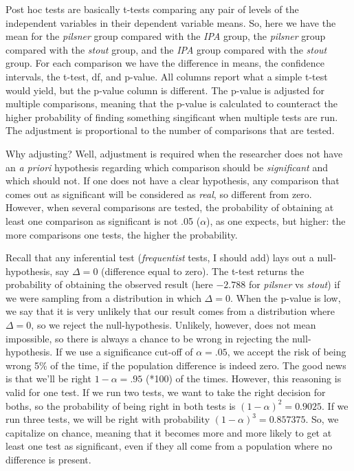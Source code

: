 \documentclass[
]{book}
\begin{document}
Post hoc tests are basically t-tests comparing any pair of levels of the independent variables in their dependent variable means. So, here we have the mean for the \emph{pilsner} group compared with the \emph{IPA} group, the \emph{pilsner} group compared with the \emph{stout} group, and the \emph{IPA} group compared with the \emph{stout} group. For each comparison we have the difference in means, the confidence intervals, the t-test, df, and p-value. All columns report what a simple t-test would yield, but the p-value column is different. The p-value is adjusted for multiple comparisons, meaning that the p-value is calculated to counteract the higher probability of finding something singificant when multiple tests are run. The adjustment is proportional to the number of comparisons that are tested.

Why adjusting? Well, adjustment is required when the researcher does not have an \emph{a priori} hypothesis regarding which comparison should be \emph{significant} and which should not. If one does not have a clear hypothesis, any comparison that comes out as significant will be considered as \emph{real}, so different from zero. However, when several comparisons are tested, the probability of obtaining at least one comparison as significant is not .05 (\(\alpha\)), as one expects, but higher: the more comparisons one tests, the higher the probability.

Recall that any inferential test (\emph{frequentist} tests, I should add) lays out a null-hypothesis, say \(\Delta=0\) (difference equal to zero). The t-test returns the probability of obtaining the observed result (here \(-2.788\) for \emph{pilsner} vs \emph{stout}) if we were sampling from a distribution in which \(\Delta=0\). When the p-value is low, we say that it is very unlikely that our result comes from a distribution where \(\Delta=0\), so we reject the null-hypothesis. Unlikely, however, does not mean impossible, so there is always a chance to be wrong in rejecting the null-hypothesis. If we use a significance cut-off of \(\alpha=.05\), we accept the risk of being wrong 5\% of the time, if the population difference is indeed zero. The good news is that we'll be right \(1-\alpha=.95\) (*100) of the times. However, this reasoning is valid for one test. If we run two tests, we want to take the right decision for boths, so the probability of being right in both tests is \((1-\alpha)^2=0.9025\). If we run three tests, we will be right with probability \((1-\alpha)^3=0.857375\). So, we capitalize on chance, meaning that it becomes more and more likely to get at least one test as significant, even if they all come from a population where no difference is present.
\end{document}
